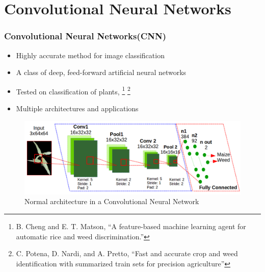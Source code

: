 \documentclass[10pt,a4paper]{beamer}
\begin{document}
\section{Convolutional Neural Networks}
\begin{frame}
\frametitle{Convolutional Neural Networks(CNN)}
\begin{itemize}
	\item Highly accurate method for image classification
	\item A class of deep, feed-forward artificial neural networks
	\item Tested on classification of plants, \footnote{B. Cheng and E. T. Matson, “A feature-based machine learning agent for automatic rice and weed discrimination.”} \footnote{ C. Potena, D. Nardi, and A. Pretto, “Fast and accurate crop and weed identification with summarized train sets for precision agriculture”
}
	\item Multiple architectures and applications
\end{itemize}
	\begin{figure}[h]
	\centering
	\includegraphics[width=3.5 in]{arquitectura}
	\caption{Normal architecture in a Convolutional Neural Network}
	\label{figure4}
	\end{figure}
\end{frame}
\end{document}
